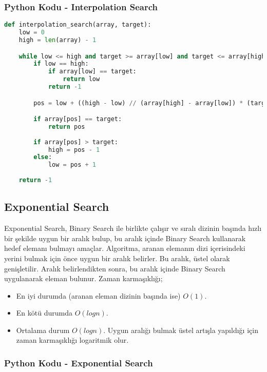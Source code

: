 \subsubsection{Python Kodu - Interpolation Search}

\begin{lstlisting}[language=Python]
def interpolation_search(array, target):
    low = 0
    high = len(array) - 1

    while low <= high and target >= array[low] and target <= array[high]:
        if low == high:
            if array[low] == target:
                return low
            return -1

        pos = low + ((high - low) // (array[high] - array[low]) * (target - array[low]))

        if array[pos] == target:
            return pos
        
        if array[pos] > target:
            high = pos - 1
        else:
            low = pos + 1
    
    return -1
\end{lstlisting}

\newpage

\subsection{Exponential Search}

Exponential Search, Binary Search ile birlikte çalışır ve sıralı dizinin başında hızlı bir şekilde uygun bir aralık bulup, bu aralık içinde Binary Search kullanarak hedef elemanı bulmayı amaçlar. Algoritma, aranan elemanın dizi içerisindeki yerini bulmak için önce uygun bir aralık belirler. Bu aralık, üstel olarak genişletilir. Aralık belirlendikten sonra, bu aralık içinde Binary Search uygulanarak eleman bulunur. Zaman karmaşıklığı;

\begin{itemize}
    \item En iyi durumda (aranan eleman dizinin başında ise) $O(1)$.
    \item En kötü durumda $O(logn)$.
    \item Ortalama durum $O(logn)$. Uygun aralığı bulmak üstel artışla yapıldığı için zaman karmaşıklığı logaritmik olur.
\end{itemize}

\subsubsection{Python Kodu - Exponential Search}

